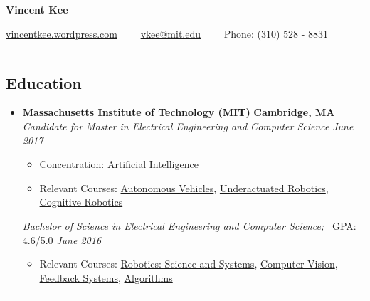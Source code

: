 \documentclass[10pt,letterpaper]{article}
\begin{document}
\begin{center}
{\huge \textbf{Vincent Kee}}

\href{http://vincentkee.wordpress.com}{vincentkee.wordpress.com}\ \ \textbullet
\ \ \href{mailto:vkee@mit.edu}{vkee@mit.edu}\ \ \textbullet
\ \  Phone: (310) 528 - 8831
\end{center}

\hrule
\vspace{-0.6em}

\subsection*{Education}
  \begin{itemize}
    \parskip=-0.1em

    \item[]
    {\href{http://mit.edu/}{\textbf{Massachusetts Institute of Technology (MIT)}} \hfill
      \textbf{Cambridge, MA}}
    \\
        {\emph{Candidate for Master in Electrical Engineering and Computer Science}\hfill 
        \emph{June 2017}} 
        \begin{itemize}	
            \parskip=-0.1em
        \item[] Concentration: Artificial Intelligence
        \item[] Relevant Courses: \href{http://student.mit.edu/catalog/search.cgi?search=2.166&style=verbatim}{Autonomous Vehicles}, \href{http://student.mit.edu/catalog/search.cgi?search=6.832&style=verbatim}{Underactuated Robotics}, \href{http://student.mit.edu/catalog/search.cgi?search=6.834&style=verbatim}{Cognitive Robotics}
         \end{itemize}
    {\emph{Bachelor of Science in Electrical Engineering and Computer Science;} \, GPA: 4.6/5.0 \hfill
      \emph{June 2016}}
      \begin{itemize}
          \parskip=-0.1em
      \item[] Relevant Courses: \href{http://student.mit.edu/catalog/search.cgi?search=6.141&style=verbatim}{Robotics: Science and Systems}, \href{http://student.mit.edu/catalog/search.cgi?search=6.869&style=verbatim}{Computer Vision}, \href{http://student.mit.edu/catalog/search.cgi?search=6.302&style=verbatim}{Feedback Systems}, \href{http://student.mit.edu/catalog/search.cgi?search=6.006&style=verbatim}{Algorithms}
   \end{itemize}   
  \end{itemize}

\hrule
\vspace{-0.6em}
\end{document}
